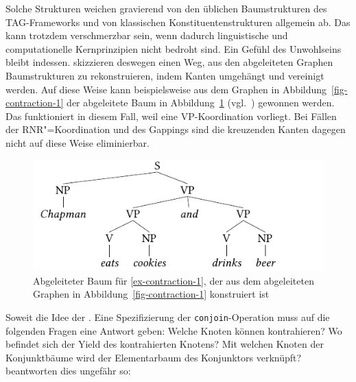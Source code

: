 Solche Strukturen weichen gravierend von den üblichen Baumstrukturen des TAG-Frameworks und von klassischen Konstituentenstrukturen allgemein ab. Das kann trotzdem verschmerzbar sein, wenn dadurch linguistische und computationelle Kernprinzipien nicht bedroht sind. Ein Gefühl des Unwohlseins bleibt indessen. \cite{Sarkar:Joshi:97} skizzieren deswegen einen Weg, aus den abgeleiteten Graphen Baumstrukturen zu rekonstruieren, indem Kanten umgehängt und vereinigt werden. Auf diese Weise kann beispielsweise aus dem Graphen in Abbildung~\ref{fig-contraction-1} der abgeleitete Baum in Abbildung~\ref{fig-kontraktion-baumisierung} (vgl.\ \citealt[Abbildung~16]{Sarkar:Joshi:97}) gewonnen werden. Das funktioniert in diesem Fall, weil eine VP-Koordination vorliegt. Bei Fällen der RNR"=Koordination und des Gappings sind die kreuzenden Kanten dagegen nicht auf diese Weise eliminierbar. 

\begin{figure}[t]
\centering
\includegraphics{graphics/abb87.pdf}
\caption{\label{fig-kontraktion-baumisierung}Abgeleiteter Baum für \ref{ex-contraction-1}, der aus dem abgeleiteten Graphen in Abbildung~\ref{fig-contraction-1} konstruiert ist}
\end{figure}

Soweit die Idee der . Eine Spezifizierung der {\tt conjoin}-Operation muss auf die folgenden Fragen eine Antwort geben: Welche Knoten können kontrahieren? Wo befindet sich der Yield des kontrahierten Knotens? Mit welchen Knoten der Konjunktbäume wird der Elementarbaum des Konjunktors verknüpft? \cite{Sarkar:Joshi:96,Sarkar:Joshi:97} beantworten dies ungefähr so: 


